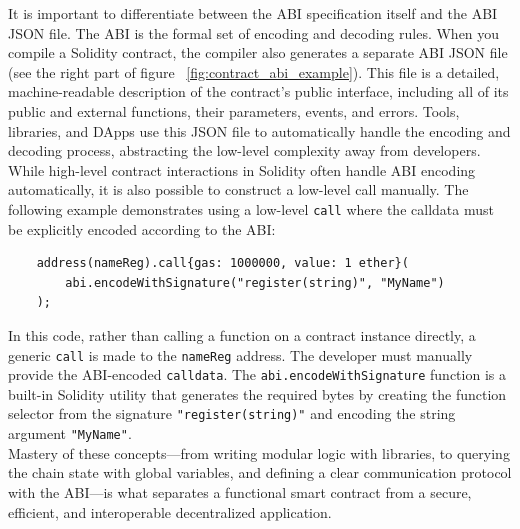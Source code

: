 \documentclass{scrbook}
\begin{document}
It is important to differentiate between the ABI specification itself and the ABI JSON file. The ABI is the formal set of encoding and decoding rules. When you compile a Solidity contract, the compiler also generates a separate ABI JSON file (see the right part of figure ~\ref{fig:contract_abi_example}). This file is a detailed, machine-readable description of the contract's public interface, including all of its public and external functions, their parameters, events, and errors. Tools, libraries, and DApps use this JSON file to automatically handle the encoding and decoding process, abstracting the low-level complexity away from developers.\\

While high-level contract interactions in Solidity often handle ABI encoding automatically, it is also possible to construct a low-level call manually. The following example demonstrates using a low-level \texttt{call} where the calldata must be explicitly encoded according to the ABI:

\begin{lstlisting}
    address(nameReg).call{gas: 1000000, value: 1 ether}(
        abi.encodeWithSignature("register(string)", "MyName")
    );
\end{lstlisting}

In this code, rather than calling a function on a contract instance directly, a generic \texttt{call} is made to the \texttt{nameReg} address. The developer must manually provide the ABI-encoded \texttt{calldata}. The \texttt{abi.encodeWithSignature} function is a built-in Solidity utility that generates the required bytes by creating the function selector from the signature \texttt{"register(string)"} and encoding the string argument \texttt{"MyName"}.\\

Mastery of these concepts—from writing modular logic with libraries, to querying the chain state with global variables, and defining a clear communication protocol with the ABI—is what separates a functional smart contract from a secure, efficient, and interoperable decentralized application.
\end{document}
